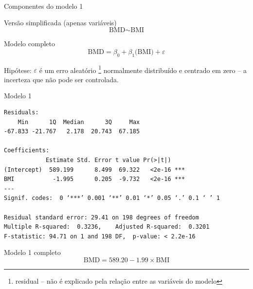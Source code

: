 \documentclass{beamer}
\begin{document}
\begin{frame}{\scriptsize Componentes do modelo 1}
  \begin{block}{\footnotesize Versão simplificada (apenas variáveis)}
    \footnotesize
    \begin{displaymath}
      \text{BMD} \sim \text{BMI}
    \end{displaymath}
  \end{block}
  \bigskip
  \bigskip
  \begin{block}{Modelo completo}
    \footnotesize
    \begin{displaymath}
      \text{BMD} =\beta_0 + \beta_1 \text{(BMI)} + \varepsilon
    \end{displaymath}
  \end{block}
  \vfill
  \footnotesize
  Hipótese: $\varepsilon$ é um erro aleatório \footnote{\scriptsize residual -- não é explicado pela relação entre as variáveis do modelo} normalmente distribuído e centrado em zero -- a incerteza que não pode ser controlada.
\end{frame}

\begin{frame}[fragile]{\scriptsize }
  \begin{center}
    \begin{exampleblock}{Modelo 1}
      \tiny
\begin{verbatim}
Residuals:
    Min      1Q  Median      3Q     Max 
-67.833 -21.767   2.178  20.743  67.185

Coefficients:
            Estimate Std. Error t value Pr(>|t|)    
(Intercept)  589.199      8.499  69.322   <2e-16 ***
BMI           -1.995      0.205  -9.732   <2e-16 ***
---
Signif. codes:  0 ‘***’ 0.001 ‘**’ 0.01 ‘*’ 0.05 ‘.’ 0.1 ‘ ’ 1

Residual standard error: 29.41 on 198 degrees of freedom
Multiple R-squared:  0.3236,	Adjusted R-squared:  0.3201
F-statistic: 94.71 on 1 and 198 DF,  p-value: < 2.2e-16
\end{verbatim}
    \end{exampleblock}
  \begin{exampleblock}{Modelo 1 completo}
    \footnotesize
    \begin{displaymath}
      \text{BMD} =589.20 -1.99 \times\text{BMI}
    \end{displaymath}
  \end{exampleblock}
  \end{center}
\end{frame}
\end{document}
